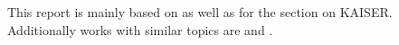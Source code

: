 This report is mainly based on \cite{drk} as well as \cite{kaiser} for the section on KAISER.
Additionally works with similar topics are \cite{echoload} and \cite{prefetch-side-channel-smap}.
